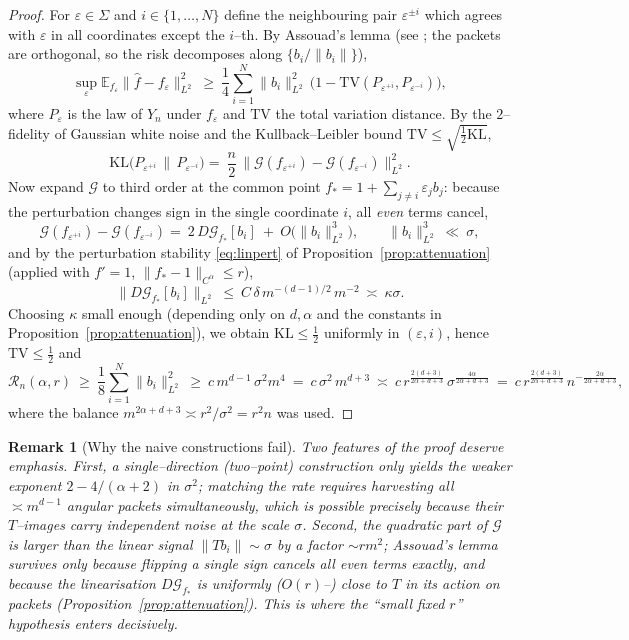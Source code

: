 \documentclass[11pt]{article}
\newtheorem{remark}[theorem]{Remark}
\newcommand{\E}{\mathbb{E}}
\newcommand{\1}{\mathbf{1}}
\newcommand{\norm}[1]{\lVert #1\rVert}
\newcommand{\Gf}{\mathcal{G}}
\begin{document}
\begin{proof}
For $\varepsilon\in\Sigma$ and $i\in\{1,\dots,N\}$ define the neighbouring pair
$\varepsilon^{\pm i}$ which agrees with $\varepsilon$ in all coordinates except the
$i$--th. By Assouad's lemma (see \cite[Sec.~2.4]{Tsybakov}; the packets are
orthogonal, so the risk decomposes along $\{b_i/\norm{b_i}\}$),
\[
\sup_{\varepsilon}\E_{f_\varepsilon}\norm{\hat f-f_\varepsilon}^2_{L^2}
\ \ge\ \frac14\sum_{i=1}^N \norm{b_i}^2_{L^2}\,
\big(1-\mathrm{TV}(P_{\varepsilon^{+i}},P_{\varepsilon^{-i}})\big),
\]
where $P_\varepsilon$ is the law of $Y_n$ under $f_\varepsilon$ and $\mathrm{TV}$ the
total variation distance. By the $2$--fidelity of Gaussian white noise and the
Kullback--Leibler bound
$\mathrm{TV}\le\sqrt{\tfrac12\mathrm{KL}}$,
\[
\mathrm{KL}\big(P_{\varepsilon^{+i}}\,\|\,P_{\varepsilon^{-i}}\big)
=\ \frac{n}{2}\,\big\|\Gf(f_{\varepsilon^{+i}})-\Gf(f_{\varepsilon^{-i}})\big\|_{L^2}^2 .
\]
Now expand $\Gf$ to third order at the common point
$f_*=1+\sum_{j\ne i}\varepsilon_j b_j$: because the perturbation changes sign in the
single coordinate $i$, all \emph{even} terms cancel,
\[
\Gf(f_{\varepsilon^{+i}})-\Gf(f_{\varepsilon^{-i}})
=\ 2\,D\Gf_{f_*}[b_i]\ +\ O\big(\norm{b_i}_{L^2}^3\big),
\qquad \norm{b_i}_{L^2}^3\ \ll\ \sigma,
\]
and by the perturbation stability \eqref{eq:linpert} of
Proposition~\ref{prop:attenuation} (applied with $f'=1$, $\norm{f_*-1}_{C^\alpha}\le r$),
\[
\norm{D\Gf_{f_*}[b_i]}_{L^2}\ \le\ C\,\delta\,m^{-(d-1)/2}\,m^{-2}
\ \asymp\ \kappa\sigma .
\]
Choosing $\kappa$ small enough (depending only on $d,\alpha$ and the constants in
Proposition~\ref{prop:attenuation}), we obtain
$\mathrm{KL}\le \tfrac12$ uniformly in $(\varepsilon,i)$, hence
$\mathrm{TV}\le\tfrac12$ and
\[
\mathcal R_n(\alpha,r)\ \ge\ \frac18\sum_{i=1}^N\norm{b_i}^2_{L^2}
\ \ge\ c\,m^{d-1}\,\sigma^2m^{4}
\ =\ c\,\sigma^2\,m^{d+3}
\ \asymp\ c\,r^{\frac{2(d+3)}{2\alpha+d+3}}\,\sigma^{\frac{4\alpha}{2\alpha+d+3}}
\ =\ c\,r^{\frac{2(d+3)}{2\alpha+d+3}}\,n^{-\frac{2\alpha}{2\alpha+d+3}},
\]
where the balance $m^{2\alpha+d+3}\asymp r^2/\sigma^2=r^2n$ was used.
\end{proof}

\begin{remark}[Why the naive constructions fail]
Two features of the proof deserve emphasis. First, a \emph{single--direction}
(two--point) construction only yields the weaker exponent
$2-4/(\alpha+2)$ in $\sigma^2$; matching the rate requires harvesting all
$\asymp m^{d-1}$ angular packets simultaneously, which is possible precisely because
their $T$--images carry independent noise at the scale $\sigma$. Second, the
quadratic part of $\Gf$ is \emph{larger} than the linear signal
$\norm{Tb_i}\sim\sigma$ by a factor $\sim rm^2$; Assouad's lemma survives only
because flipping a single sign cancels all even terms exactly, and because the
linearisation $D\Gf_{f_*}$ is uniformly ($O(r)$--) close to $T$ in its action on
packets (Proposition~\ref{prop:attenuation}). This is where the ``small fixed $r$''
hypothesis enters decisively.
\end{remark}
\end{document}
